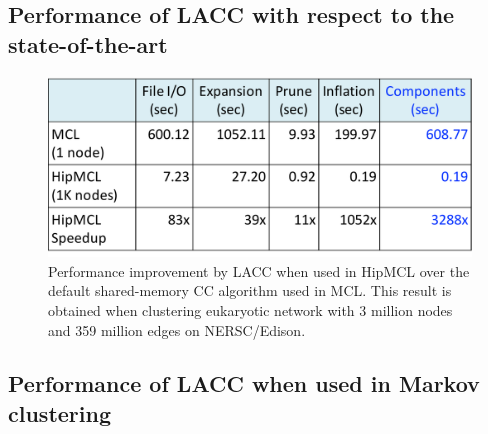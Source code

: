 \subsection{Performance of LACC with respect to the state-of-the-art}


\begin{figure}[!t]
   \centering
   \includegraphics[scale=.5]{figures/hipmcl} %
   \caption{Performance improvement by LACC when used in HipMCL over the default shared-memory CC algorithm used in MCL. This result is obtained when clustering eukaryotic network with 3 million nodes and 359 million edges on NERSC/Edison.}
   \label{fig:hipmcl}
\end{figure}

\subsection{Performance of LACC when used in Markov clustering}


